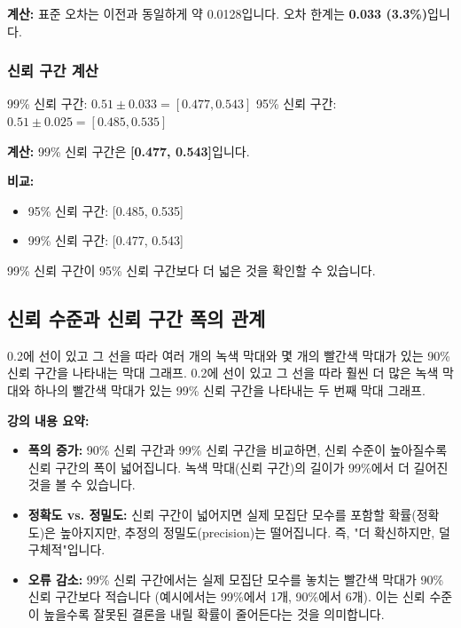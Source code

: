 \documentclass[11pt,a4paper]{article}
\begin{document}
\textbf{계산:}
표준 오차는 이전과 동일하게 약 0.0128입니다.
오차 한계는 \textbf{0.033 (3.3\%)}입니다.

\subsubsection{신뢰 구간 계산}

\begin{tcolorbox}[title=슬라이드 78: 연습 - 풀이]
99\% 신뢰 구간: $0.51 \pm 0.033 = [0.477, 0.543]$
95\% 신뢰 구간: $0.51 \pm 0.025 = [0.485, 0.535]$
\end{tcolorbox}

\textbf{계산:}
99\% 신뢰 구간은 \textbf{[0.477, 0.543]}입니다.

\textbf{비교:}
\begin{itemize}
    \item 95\% 신뢰 구간: [0.485, 0.535]
    \item 99\% 신뢰 구간: [0.477, 0.543]
\end{itemize}
99\% 신뢰 구간이 95\% 신뢰 구간보다 더 넓은 것을 확인할 수 있습니다.

\subsection{신뢰 수준과 신뢰 구간 폭의 관계}

\begin{tcolorbox}[title=슬라이드 79: 90\% 신뢰 구간 vs. 99\% 신뢰 구간]
0.2에 선이 있고 그 선을 따라 여러 개의 녹색 막대와 몇 개의 빨간색 막대가 있는 90\% 신뢰 구간을 나타내는 막대 그래프. 0.2에 선이 있고 그 선을 따라 훨씬 더 많은 녹색 막대와 하나의 빨간색 막대가 있는 99\% 신뢰 구간을 나타내는 두 번째 막대 그래프.
\end{tcolorbox}

\textbf{강의 내용 요약:}
\begin{itemize}
    \item \textbf{폭의 증가:} 90\% 신뢰 구간과 99\% 신뢰 구간을 비교하면, 신뢰 수준이 높아질수록 신뢰 구간의 폭이 넓어집니다. 녹색 막대(신뢰 구간)의 길이가 99\%에서 더 길어진 것을 볼 수 있습니다.
    \item \textbf{정확도 vs. 정밀도:} 신뢰 구간이 넓어지면 실제 모집단 모수를 포함할 확률(정확도)은 높아지지만, 추정의 정밀도(precision)는 떨어집니다. 즉, "더 확신하지만, 덜 구체적"입니다.
    \item \textbf{오류 감소:} 99\% 신뢰 구간에서는 실제 모집단 모수를 놓치는 빨간색 막대가 90\% 신뢰 구간보다 적습니다 (예시에서는 99\%에서 1개, 90\%에서 6개). 이는 신뢰 수준이 높을수록 잘못된 결론을 내릴 확률이 줄어든다는 것을 의미합니다.
\end{itemize}
\end{document}
